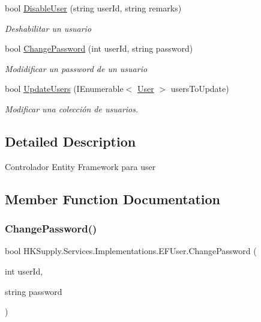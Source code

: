 \begin{DoxyCompactItemize}
bool \mbox{\hyperlink{class_h_k_supply_1_1_services_1_1_implementations_1_1_e_f_user_acb2996bf9f333684786d3e2d7b702ba4}{Disable\+User}} (string user\+Id, string remarks)
\begin{DoxyCompactList}\small\item\em Deshabilitar un usuario \end{DoxyCompactList}\item 
bool \mbox{\hyperlink{class_h_k_supply_1_1_services_1_1_implementations_1_1_e_f_user_ada8f9352d6fed7594d449aed92f452a0}{Change\+Password}} (int user\+Id, string password)
\begin{DoxyCompactList}\small\item\em Modidificar un password de un usuario \end{DoxyCompactList}\item 
bool \mbox{\hyperlink{class_h_k_supply_1_1_services_1_1_implementations_1_1_e_f_user_af7bbea584cce6ec7e2b8f4b4d46c01f6}{Update\+Users}} (I\+Enumerable$<$ \mbox{\hyperlink{class_h_k_supply_1_1_models_1_1_user}{User}} $>$ users\+To\+Update)
\begin{DoxyCompactList}\small\item\em Modificar una colección de usuarios. \end{DoxyCompactList}\end{DoxyCompactItemize}


\subsection{Detailed Description}
Controlador Entity Framework para user 



\subsection{Member Function Documentation}
\mbox{\label{class_h_k_supply_1_1_services_1_1_implementations_1_1_e_f_user_ada8f9352d6fed7594d449aed92f452a0}} 
\subsubsection{\texorpdfstring{Change\+Password()}{ChangePassword()}}
{\footnotesize\ttfamily bool H\+K\+Supply.\+Services.\+Implementations.\+E\+F\+User.\+Change\+Password (\begin{DoxyParamCaption}\item[{int}]{user\+Id,  }\item[{string}]{password }\end{DoxyParamCaption})}



